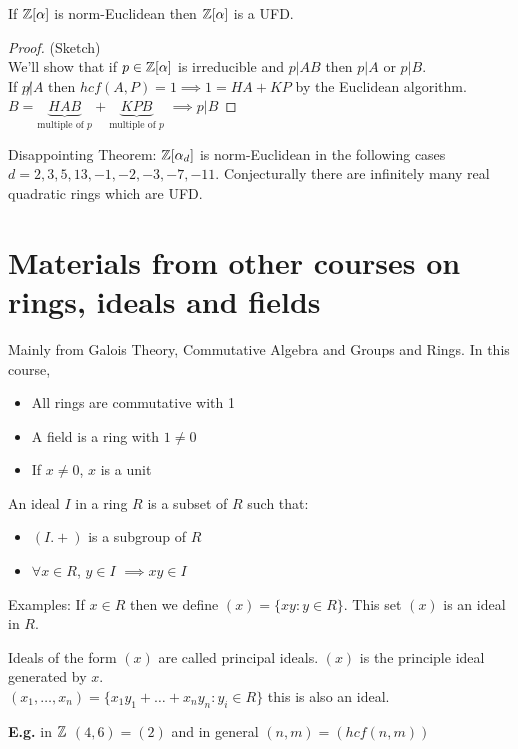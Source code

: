 \documentclass[11pt]{article}
\begin{document}
\begin{prop}
	If $\mathbb{Z}[\alpha]$ is norm-Euclidean then $\mathbb{Z}[\alpha]$ is a UFD.
\end{prop}
\begin{proof}
	(Sketch)\\
	We'll show that if $p \in \mathbb{Z}[\alpha]$ is irreducible and $p|AB$ then $p|A$ or $p|B$.\\
	If $p \not | A $ then $ hcf(A,P) = 1 \implies 1 = HA+KP$ by the Euclidean algorithm.\\
	$B = \underbrace{HAB}_\text{multiple of $p$} +\underbrace{KPB}_\text{multiple of $p$}$ $\implies p | B$
\end{proof}

\begin{theorem}
	Disappointing Theorem: $\mathbb{Z}[\alpha_d] $ is norm-Euclidean in the following cases $d = 2,3,5,13,-1,-2,-3,-7,-11$.
	Conjecturally there are infinitely many real quadratic rings which are UFD.
\end{theorem}

\section{Materials from other courses on rings, ideals and fields}
Mainly from Galois Theory, Commutative Algebra and Groups and Rings. 
In this course, 

\begin{itemize}
	\item{All rings are commutative with 1}
	\item{A field is a ring with $1 \neq 0$}
	\item{If $x\neq 0$, $x$ is a unit }
\end{itemize}

\begin{defn}
An ideal $I$ in a ring $R$ is a subset of $R$ such that:

	\begin{itemize}
		\item{$(I.+)$ is a subgroup of $R$}
		\item{$\forall x \in R $, $y \in I$ $\implies xy \in I$}
	\end{itemize}
\end{defn}
$ $\\
Examples: If $x \in R$ then we define $(x) = \{ xy: y \in R \}$.
This set $(x)$ is an ideal in $R$.


\begin{defn}
	Ideals of the form $(x)$ are called principal ideals. 
	$(x)$ is the principle ideal generated by $x$.\\
	$(x_1, \dots, x_n) = \{x_1y_1 + \dots + x_ny_n : y_i \in R\}$ this is also an ideal.
\end{defn}
$ $\\[1em]
\textbf{E.g.} in $\mathbb{Z}$ $(4,6) = (2)$ and in general $(n,m) = (hcf(n,m))$
\end{document}
